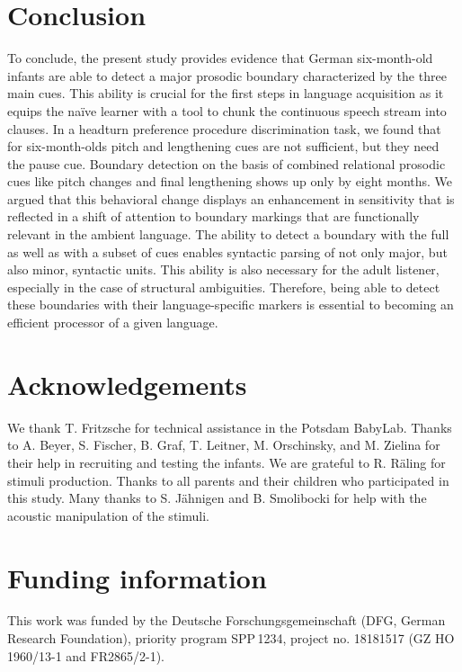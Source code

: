 \documentclass[output=paper]{langscibook}
\begin{document}
\section{Conclusion}
To conclude, the present study provides evidence that German six-month-old infants are able to detect a major prosodic boundary characterized by the three main cues. This ability is crucial for the first steps in language acquisition as it equips the naïve learner with a tool to chunk the continuous speech stream into clauses. In a headturn preference procedure discrimination task, we found that for six-month-olds pitch and lengthening cues are not sufficient, but they need the pause cue. Boundary detection on the basis of combined relational prosodic cues like pitch changes and final lengthening shows up only by eight months. We argued that this behavioral change displays an enhancement in sensitivity that is reflected in a shift of attention to boundary markings that are functionally relevant in the ambient language. The ability to detect a boundary with the full as well as with a subset of cues enables syntactic parsing of not only major, but also minor, syntactic units. This ability is also necessary for the adult listener, especially in the case of structural ambiguities. Therefore, being able to detect these boundaries with their language-specific markers is essential to becoming an efficient processor of a given language.


\section*{Acknowledgements}
We thank T. Fritzsche for technical assistance in the Potsdam BabyLab. Thanks to A. Beyer, S. Fischer, B. Graf, T. Leitner, M. Orschinsky, and M. Zielina for their help in recruiting and testing the infants. We are grateful to R. Räling for stimuli production. Thanks to all parents and their children who participated in this study. Many thanks to S. Jähnigen and B. Smolibocki for help with the acoustic manipulation of the stimuli. 

\section*{Funding information}
This work was funded by the Deutsche Forschungsgemeinschaft (DFG, German Research Foundation), priority program SPP\,1234, project no. 18181517 (GZ HO 1960\slash 13-1 and FR2865\slash 2-1).

\printbibliography[heading=subbibliography,notkeyword=this]
\end{document}
